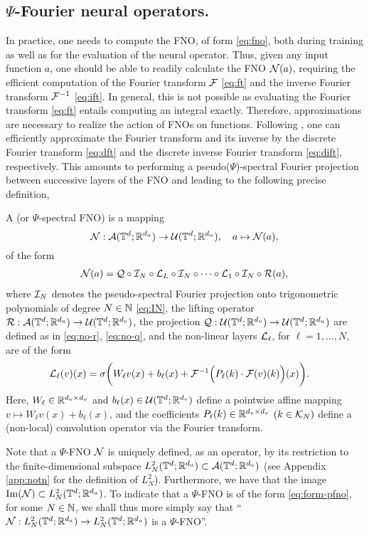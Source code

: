 \documentclass[reqno,a4paper]{amsart}
\begin{document}
\subsection{{$\Psi$}-Fourier neural operators.}
In practice, one needs to compute the FNO, of form \eqref{eq:fno}, both during training as well as for the evaluation of the neural operator. Thus, given any input function $a$, one should be able to readily calculate the FNO $\mathcal{N}(a)$, requiring the efficient computation of the Fourier transform $\mathcal{F}$ \eqref{eq:ft} and the inverse Fourier transform $\mathcal{F}^{-1}$ \eqref{eq:ift}. In general, this is not possible as evaluating the Fourier transform \eqref{eq:ft} entails computing an integral exactly. Therefore, approximations are necessary to realize the action of FNOs on functions. Following \cite{fourierop2020}, one can efficiently approximate the Fourier transform and its inverse by the discrete Fourier transform \eqref{eq:dft} and the discrete inverse Fourier transform \eqref{eq:dift}, respectively. This amounts to performing a pseudo($\Psi$)-spectral Fourier projection between successive layers of the FNO and leading to the following precise definition, 
\begin{definition} \label{def:pfno}
A  (or $\Psi$-spectral FNO) is a mapping 
\[
\mathcal{N}: \mathcal{A}(\mathbb{T}^d;\mathbb{R}^{d_a}) \to \mathcal{U}(\mathbb{T}^d;\mathbb{R}^{d_u}), \quad a \mapsto \mathcal{N}(a),
\]
of the form 
\begin{align} \label{eq:form-pfno}
\mathcal{N}(a) 
=
\mathcal{Q} \circ \mathcal{I}_N \circ \mathcal{L}_L \circ \mathcal{I}_N  \circ \dots \circ \mathcal{L}_1 \circ \mathcal{I}_N \circ \mathcal{R}(a),
\end{align}
where $\mathcal{I}_N$ denotes the pseudo-spectral Fourier projection onto trigonometric polynomials of degree $N\in \mathbb{N}$ \eqref{eq:IN}, the lifting operator $\mathcal{R}: \mathcal{A}(\mathbb{T}^d;\mathbb{R}^{d_a}) \to \mathcal{U}(\mathbb{T}^d;\mathbb{R}^{d_v})$, the projection $\mathcal{Q}: \mathcal{U}(\mathbb{T}^d;\mathbb{R}^{d_v}) \to \mathcal{U}(\mathbb{T}^d;\mathbb{R}^{d_u})$ are defined as in \eqref{eq:no-r}, \eqref{eq:no-q}, and the non-linear layers $\mathcal{L}_{\ell}$, for $\ell=1,\dots, N$, are of the form 
\begin{align*}
\mathcal{L}_\ell(v)(x) &= 
\sigma\bigg(
W_\ell v(x) + b_{\ell}(x) + \mathcal{F}^{-1}\Big(P_\ell(k) \cdot \mathcal{F}(v)(k)\Big)(x)
\bigg).
\end{align*}
Here, $W_\ell\in \mathbb{R}^{d_v\times d_v}$ and $b_{\ell}(x) \in \mathcal{U}(\mathbb{T}^d;\mathbb{R}^{d_v})$ define a pointwise affine mapping $v \mapsto W_\ell v(x) + b_{\ell}(x)$, and the coefficients $P_\ell(k) \in \mathbb{R}^{d_v\times d_v}$ $(k\in \mathcal{K}_N)$ define a (non-local) convolution operator via the Fourier transform.

Note that a $\Psi$-FNO $\mathcal{N}$ is uniquely defined, as an operator, by its restriction to the finite-dimensional subspace $L^2_N(\mathbb{T}^d; \mathbb{R}^{d_a}) \subset \mathcal{A}(\mathbb{T}^d;\mathbb{R}^{d_a})$ (see Appendix \ref{app:notn} for the definition of $L^2_N$). Furthermore, we have that the image $\mathrm{Im}(\mathcal{N}) \subset L^2_N(\mathbb{T}^d;\mathbb{R}^{d_u})$. To indicate that a $\Psi$-FNO is of the form \ref{eq:form-pfno}, for some $N\in \mathbb{N}$, we shall thus more simply say that ``$\mathcal{N}: L^2_N(\mathbb{T}^d;\mathbb{R}^{d_a})\to L^2_N(\mathbb{T}^d;\mathbb{R}^{d_u})$ is a $\Psi$-FNO''.
\end{definition}
\end{document}
